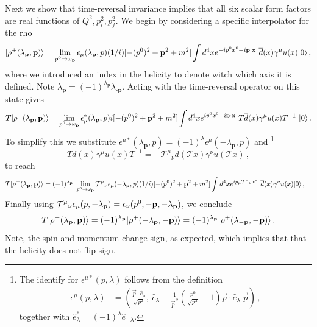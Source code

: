 { Next we show that time-reversal invariance implies that all six scalar form factors are real functions of $Q^2,p_i^2,p_f^2$. We begin by
considering a specific interpolator for the rho
\begin{equation}
\vert \rho^+( \lambda_{\textbf{p}}, \textbf p ) \rangle =  \lim_{p^0 \to \omega_\textbf p}  \epsilon_{\mu}(\lambda_{\textbf{p}}, p)(1/i) [- (p^0)^2 + \textbf p^2 + m^2] \int d^4 x e^{- i p^0  x^0 + i \textbf p \cdot \textbf x} \ \overline d(x) \gamma^\mu u(x) \vert 0 \rangle \,,
\end{equation}
where we introduced an index in the helicity to denote witch which axis it is defined. Note $\lambda_{\textbf{p}}=(-1)^{\lambda_{\textbf{p}}}\lambda_{\textbf{-p}}$. Acting with the time-reversal operator on this state gives
\begin{equation}
T \vert \rho^+( \lambda_{\textbf{p}}, \textbf p) \rangle =  \lim_{p^0 \to \omega_\textbf p} \epsilon^*_{\mu}(\lambda_{\textbf{p}}, p) i [- (p^0)^2 + \textbf p^2 + m^2] \int d^4 x e^{ i p^0  x^0 - i \textbf p \cdot \textbf x} \ T \overline d(x) \gamma^\mu u(x)     T^{-1} \  \vert 0 \rangle \,.
\end{equation}
To simplify this we substitute $\epsilon^{\mu*}( \lambda_{\textbf{p}}, p) = (-1)^\lambda \epsilon^{\mu}( - \lambda_{\textbf{p}} , p)$ and%
%
\footnote{
The identify for $\epsilon^{\mu*}( p, \lambda) $ follows from the definition
\begin{align}
\epsilon^{\mu}(p,\lambda) & =
\left(\frac{\vec{p}\cdot\hat{e}_\lambda}{ \sqrt{p^2} }, \ \hat{e}_\lambda + \frac{1}{\vec p^{\,2}} \left( \frac{p^0}{\sqrt{p^2}} - 1  \right) {\vec{p}\cdot\hat{e}_\lambda} \ \vec{p}\right) \,,
\end{align} 
together with $\hat{e}_{\lambda}^* = (-1)^\lambda \hat{e}_{-\lambda}$.
}
%  
\begin{equation}
T \overline d(x) \gamma^\mu u(x)     T^{-1} = - {\mathcal T^\mu}_\nu \overline d(\mathcal T x) \gamma^\nu u(\mathcal T x)     \,,
\end{equation}
to reach
\begin{align}
T \vert \rho^+( \lambda_{\textbf{p}}, \textbf p) \rangle & =   (- 1)^{\lambda_{\textbf{p}}}  \  \lim_{p^0 \to \omega_\textbf p}   {\mathcal T^\mu}_\nu   \epsilon_{\mu}(- \lambda_{\textbf{p}}, p) (1/i) [- (p^0)^2 + \textbf p^2 + m^2] \int d^4 x e^{ i p_\mu {\mathcal T^\mu}_\nu  x^\nu} \   \overline d(x) \gamma^\nu u(x)      \vert 0 \rangle \,, 
\end{align}
Finally using $ {\mathcal T^\mu}_\nu \epsilon_{\mu}(p, - \lambda_{\textbf{p}}) = \epsilon_{\nu}(p^0, - \textbf p, - \lambda_{\textbf{p}})$, we conclude
\begin{equation}
 T \vert \rho^+(\lambda_{\textbf{p}}, \textbf p) \rangle = (-1)^{\lambda_{\textbf{p}}} \vert \rho^+(- \lambda_{\textbf{p}} ,- \textbf p) \rangle
 = (-1)^{\lambda_{\textbf{p}}} \vert \rho^+( \lambda_{-\textbf{p}} ,- \textbf p) \rangle \,.
\end{equation}
Note, the spin and momentum change sign, as expected, which implies that that the helicity does not flip sign. 

}
